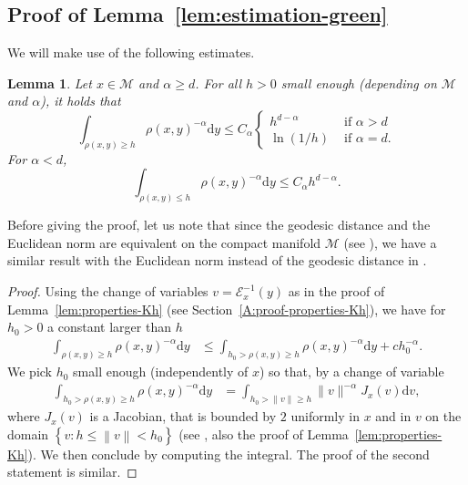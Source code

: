 \documentclass[10pt,a4paper]{article}
\newcommand\cE{\mathcal{E}}
\newcommand\cM{\mathcal{M}}
\newcommand\dd{\mathrm{d}}
\newcommand{\BRA}[1]{{{\left\{#1\right\}}}} %
\newcommand{\NRM}[1]{{{\left\| #1\right\|}}} %
\renewcommand{\leq}{\leqslant}
\newtheorem{lemma}[theorem]{Lemma}
\begin{document}
\subsection{Proof of Lemma~\ref{lem:estimation-green}}\label{A:estimation-green-proof} 
We will make use of the following estimates.
\begin{lemma}\label{lem:integral}
Let  $x\in \cM$ and $\alpha \ge d$. For all $h>0$ small enough (depending on $\cM$ and $\alpha$), it holds that 
\begin{equation}
\int_{\rho(x,y)\ge h} \rho(x,y)^{-\alpha}\dd y \le C_{\alpha} \begin{cases}
h^{d-\alpha} &\text{ if }\alpha> d\\
\ln(1/h)&\text{ if }\alpha= d.
\end{cases} 
\end{equation} 
{For $\alpha< d$},
\begin{equation}\label{eq:bound geodesic distance on a small ball}
\int_{\rho(x,y)\le h} \rho(x,y)^{-\alpha}\dd y \le C_{\alpha} 
h^{d-\alpha}.
\end{equation} 
\end{lemma}
Before giving the proof, let us note that since the geodesic distance and the Euclidean norm are equivalent on the compact manifold $\cM$ (see \cite[Proposition 2]{Trillos2020}), we have a similar result with the Euclidean norm instead of the geodesic distance in .
\begin{proof}
    Using the change of variables $v=\cE_x^{-1}(y)$ as in the proof of Lemma~\ref{lem:properties-Kh} (see Section~\ref{A:proof-properties-Kh}), we have for $h_0>0$  a constant larger than $h$
    \begin{align*}
        \int_{\rho(x,y)\ge h}\rho(x,y)^{-\alpha}\dd y&\le \int_{h_0>\rho(x,y)\ge h}\rho(x,y)^{-\alpha}\dd y +c h_0^{-\alpha}.
    \end{align*}
    We pick $h_0$ small enough (independently of $x$) so that, by a change of variable
    \begin{align*}
        \int_{h_0>\rho(x,y)\ge h}\rho(x,y)^{-\alpha}\dd y&= \int_{h_0>\|v\|\ge h} \|v\|^{-\alpha} J_x(v)\dd v,
    \end{align*}
    where $J_x(v)$ is a Jacobian, that is bounded by $2$ uniformly in $x$ and in $v$ on the domain $\BRA{v:h\leq \NRM{v}<h_0}$ (see \cite[Theorem 3.4 ii.]{guerinnguyentran}, also the proof of Lemma~\ref{lem:properties-Kh}). We then conclude by computing the integral. The proof of the second statement is similar.
\end{proof}
\end{document}
